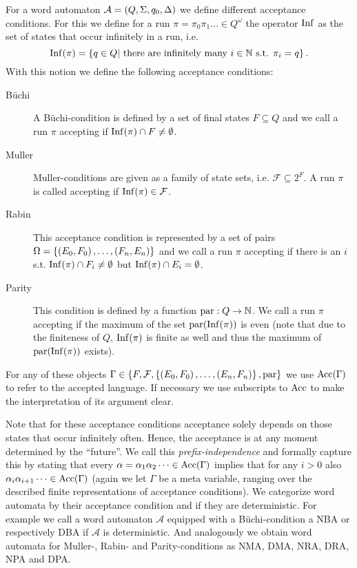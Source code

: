 \begin{definition}
  For a word automaton $\mathcal{A} = \left(Q, \Sigma, q_{0}, \Delta\right)$ we
  define different acceptance conditions. For this we define for a run
  $\pi = \pi_{0}\pi_{1}\dots\in Q^{\omega}$ the operator
  $\operatorname{Inf}$ as the set of states that occur infinitely in a run, i.e.
  \begin{equation*}
    \operatorname{Inf}(\pi) = \left\{q\in Q\middle| \text{ there are infinitely many }
    i\in\mathbb{N} \text{ s.t. } \pi_{i} = q\right\}.
  \end{equation*}
  With this notion we define the following acceptance conditions:
  \begin{description}
    \item [Büchi] A Büchi-condition is defined by a set of final states
      $F\subseteq Q$ and we call a run $\pi$ accepting if
      $\operatorname{Inf}(\pi)\cap F\neq\emptyset$.
    \item [Muller] Muller-conditions are given as a family of state sets, i.e.
      $\mathcal{F}\subseteq 2^{F}$. A run $\pi$ is called accepting if
      $\operatorname{Inf}(\pi)\in\mathcal{F}$.
    \item [Rabin] This acceptance condition is represented by a set of pairs\\
      $\Omega = \left\{\left(E_{0}, F_{0}\right), \dots, \left(F_{n}, E_{n}\right)\right\}$ and we
      call a run $\pi$ accepting if there is an $i$ s.t.
      $\operatorname{Inf}(\pi)\cap F_{i}\neq\emptyset$ but $\operatorname{Inf}(\pi)\cap E_{i} = \emptyset$.
    \item [Parity] This condition is defined by a function
      $\operatorname{par}:Q\rightarrow \mathbb{N}$. We call a run $\pi$ accepting if the
      maximum of the set $\operatorname{par}(\operatorname{Inf}(\pi))$ is even (note that due to the 
      finiteness of $Q$, $\operatorname{Inf}(\pi)$ is finite as well and thus the maximum of 
      $\operatorname{par}(\operatorname{Inf}(\pi))$ exists).
  \end{description}
  For any of these objects $\Gamma\in\left\{F, \mathcal{F}, \left\{\left(E_{0},
  F_{0}\right),\dots,\left(E_{n}, F_{n}\right)\right\}, \operatorname{par}\right\}$ we use $\operatorname{Acc}(\Gamma)$ to refer
  to the accepted language. If necessary we use subscripts to $\operatorname{Acc}$ to make 
  the interpretation of its argument clear.
\end{definition}
Note that for these acceptance conditions acceptance solely depends on those
states that occur infinitely often. Hence, the acceptance is at any moment
determined by the \enquote{future}. We call this \emph{prefix-independence} and
formally capture this by stating that every
$\alpha = \alpha_{1}\alpha_{2}\dots\in\operatorname{Acc}(\Gamma)$ implies that for any $i>0$
also $\alpha_{i}\alpha_{i+1}\dots\in\operatorname{Acc}(\Gamma)$ (again we let $\Gamma$ be a
meta variable, ranging over the described finite representations of acceptance
conditions). We categorize word automata by their acceptance condition and if
they are deterministic. For example we call a word automaton $\mathcal{A}$
equipped with a Büchi-condition a \ac{NBA} or respectively \ac{DBA} if
$\mathcal{A}$ is deterministic. And analogously we obtain word automata for
Muller-, Rabin- and Parity-conditions as
\ac{NMA}, \ac{DMA}, \ac{NRA}, \ac{DRA}, \ac{NPA} and \ac{DPA}.

